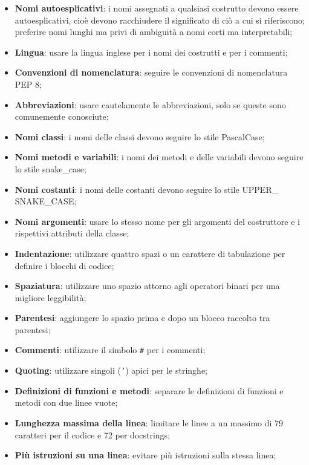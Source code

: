 \documentclass[10pt, a4paper]{article}
\begin{document}
\begin{itemize}
    \item \textbf{Nomi autoesplicativi}: i nomi assegnati a qualsiasi costrutto devono essere autoesplicativi, cioè devono racchiudere il significato di ciò a cui si riferiscono;
    preferire nomi lunghi ma privi di ambiguità a nomi corti ma interpretabili;
    \item \textbf{Lingua}: usare la lingua inglese per i nomi dei costrutti e per i commenti;
    \item \textbf{Convenzioni di nomenclatura}: seguire le convenzioni di nomenclatura PEP 8;
    \item \textbf{Abbreviazioni}: usare cautelamente le abbreviazioni, solo se queste sono comunemente conosciute;
    \item \textbf{Nomi classi}: i nomi delle classi devono seguire lo stile PascalCase;
    \item \textbf{Nomi metodi e variabili}: i nomi dei metodi e delle variabili devono seguire lo stile snake\_case;
    \item \textbf{Nomi costanti}: i nomi delle costanti devono seguire lo stile UPPER\_ SNAKE\_CASE;
    \item \textbf{Nomi argomenti}: usare lo stesso nome per gli argomenti del costruttore e i rispettivi attributi della classe;
    \item \textbf{Indentazione}: utilizzare quattro spazi o un carattere di tabulazione per definire i blocchi di codice;
    \item \textbf{Spaziatura}: utilizzare uno spazio attorno agli operatori binari per una migliore leggibilità;
    \item \textbf{Parentesi}: aggiungere lo spazio prima e dopo un blocco raccolto tra parentesi;
    \item \textbf{Commenti}: utilizzare il simbolo \texttt{\#} per i commenti;
    \item \textbf{Quoting}: utilizzare singoli (\texttt{'}) apici per le stringhe;
    \item \textbf{Definizioni di funzioni e metodi}: separare le definizioni di funzioni e metodi con due linee vuote;
    \item \textbf{Lunghezza massima della linea}: limitare le linee a un massimo di 79 caratteri per il codice e 72 per docstrings;
    \item \textbf{Più istruzioni su una linea}: evitare più istruzioni sulla stessa linea;
\end{itemize}
\end{document}
